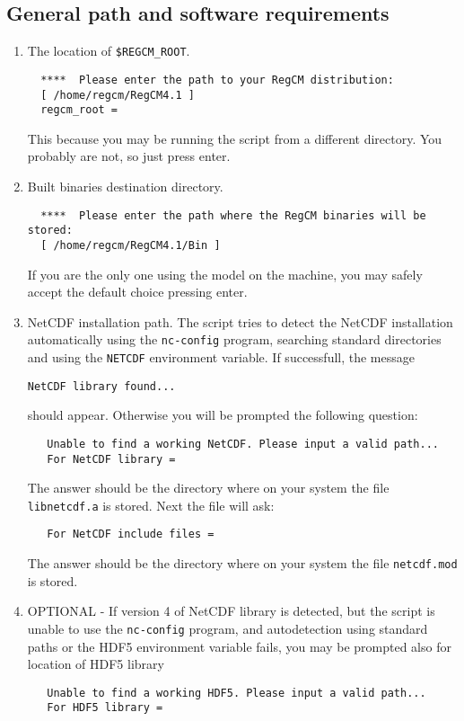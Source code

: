 \subsection{General path and software requirements}
\begin{enumerate}
\item The location of \verb=$REGCM_ROOT=.
\begin{Verbatim}
  ****  Please enter the path to your RegCM distribution: 
  [ /home/regcm/RegCM4.1 ]
  regcm_root =
\end{Verbatim}
This because you may be running the script from a different directory.
You probably are not, so just press enter.
\item Built binaries destination directory.
\begin{Verbatim}
  ****  Please enter the path where the RegCM binaries will be stored: 
  [ /home/regcm/RegCM4.1/Bin ]
\end{Verbatim}
If you are the only one using the model on the machine, you may safely
accept the default choice pressing enter.
\item NetCDF installation path. The script tries to detect the NetCDF
installation automatically using the \verb=nc-config= program, searching
standard directories and using the \verb=NETCDF= environment variable.
If successfull, the message
\begin{Verbatim}
NetCDF library found...
\end{Verbatim}
should appear. Otherwise you will be prompted the following question:
\begin{Verbatim}
   Unable to find a working NetCDF. Please input a valid path...
   For NetCDF library =
\end{Verbatim}
The answer should be the directory where on your system the file
\verb=libnetcdf.a= is stored. Next the file will ask:
\begin{Verbatim}
   For NetCDF include files =
\end{Verbatim}
The answer should be the directory where on your system the file
\verb=netcdf.mod= is stored.
\item OPTIONAL - If version 4 of NetCDF library is detected, but the
script is unable to use the \verb=nc-config= program, and autodetection
using standard paths or the HDF5 environment variable fails, you may be
prompted also for location of HDF5 library
\begin{Verbatim}
   Unable to find a working HDF5. Please input a valid path...
   For HDF5 library =
\end{Verbatim}

\end{enumerate}
